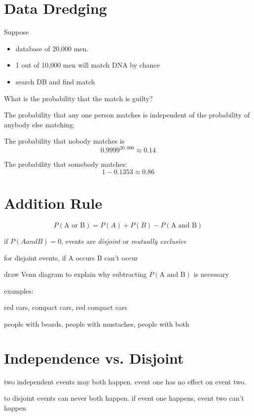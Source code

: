 \documentclass[landscape]{exam}
\begin{document}
  \section{Data Dredging}
  Suppose 
  \begin{itemize}
    \item database of 20,000 men.
    \item 1 out of 10,000 men will match DNA by chance
    \item search DB and find match
  \end{itemize}

  What is the probability that the match is guilty?

  \begin{solution}
    The probability that any one person matches is independent of the
    probability of anybody else matching.

    The probability that nobody matches is
    \[
      0.9999^{20,000} \approx 0.14
    \]

    The probability that somebody matches:
    \[
      1 - 0.1353 \approx 0.86
    \]
  \end{solution}

  \section{Addition Rule}

  \[
    P(\text{A or B}) = P(A) + P(B) - P(\text{A and B})
  \]

  \begin{itemize*}
    \item if $P(A and B) = 0$, events are {\em disjoint} or {\em mutually
      exclusive}
    \item for disjoint events, if A occurs B can't occur
    \item draw Venn diagram to explain why subtracting $P(\text{A and B})$ is
      necessary
  \end{itemize*}

  examples:
  \begin{itemize*}
    \item red cars, compact cars, red compact cars
    \item people with beards, people with mustaches, people with both
  \end{itemize*}

  \section{Independence vs. Disjoint}
  \begin{itemize*}
    \item two independent events may both happen. event one has no effect on
      event two.

    \item to disjoint events can never both happen. if event one happens, event
      two can't happen

  \end{itemize*}
\end{document}
